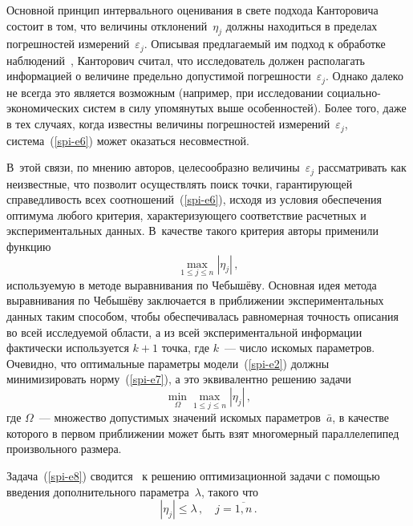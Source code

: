 {\begin{multicols}{2}
  Основной принцип интервального оценивания в свете подхода
Канторовича состоит в том, что величины отклонений~$\eta_j$ должны
находиться в пределах погрешностей измерений~$\varepsilon_j$. Описывая
предлагаемый им подход к обработке наблюдений~\cite{spi-6},
Канторович считал, что исследователь должен располагать информацией
о величине предельно допустимой погрешности~$\varepsilon_j$. Однако далеко
не всегда это является возможным (например, при исследовании
со\-ци\-аль\-но-эко\-но\-ми\-че\-ских систем в силу упомянутых выше особенностей). Более того,
даже в тех случаях, когда известны величины погрешностей
измерений~$\varepsilon_j$, система~(\ref{spi-e6}) может оказаться
несовместной.

  В~этой связи, по мнению авторов, целесообразно величины~$\varepsilon_j$
рассматривать как неизвестные, что позволит осуществлять поиск точки,
гаранти\-ру\-ющей справедливость всех соотношений~(\ref{spi-e6}), исходя из
условия обеспечения оптимума любого критерия, характеризующего
соответствие расчетных и экспериментальных данных. В~качестве такого
критерия авторы применили функцию
  \begin{equation}
  \max\limits_{1\leq j \leq n} \left\vert \eta_j\right\vert \,,
  \label{spi-e7}
  \end{equation}
используемую в методе выравнивания по Чебы\-шёву. Основная идея метода
выравнивания по\linebreak
 Чебышёву заключается в приближении экспериментальных
данных таким способом, чтобы обеспечивалась равномерная точность описания
во всей исследуемой области, а из всей экспериментальной информации
фактически используется $k+1$ точка, где $k$~--- число искомых параметров.
Очевидно, что оптимальные параметры модели~(\ref{spi-e2}) должны
минимизировать норму~(\ref{spi-e7}), а это эквивалентно решению задачи
  \begin{equation}
  \min\limits_{\Omega}\max\limits_{1\leq j \leq n} \left\vert \eta_j\right\vert \,,
  \label{spi-e8}
  \end{equation}
где $\Omega$~--- множество допустимых значений искомых
параметров~$\bar{a}$, в качестве которого в первом приближении может быть
взят многомерный параллелепипед произвольного размера.

  Задача~(\ref{spi-e8}) сводится~\cite{spi-5} к решению оптимизационной
задачи с помощью введения дополнительного параметра~$\lambda$, такого что
\begin{equation*}
\left\vert \eta_j \right\vert \leq \lambda\,, \quad j = \overline{1, n}\,.
\end{equation*}


\end{multicols}}

